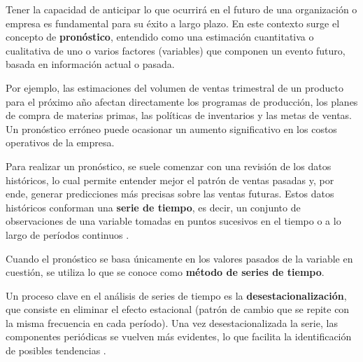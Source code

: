 Tener la capacidad de anticipar lo que ocurrirá en el futuro de una organización
o empresa es fundamental para su éxito a largo plazo.
En este contexto surge el concepto de \textbf{pronóstico}, entendido como una
estimación cuantitativa o cualitativa de uno o varios factores (variables) que
componen un evento futuro, basada en información actual o pasada.

Por ejemplo, las estimaciones del volumen de ventas trimestral de un producto
para el próximo año afectan directamente los programas de producción, los planes
de compra de materias primas, las políticas de inventarios y las metas de
ventas.
Un pronóstico erróneo puede ocasionar un aumento significativo en los costos
operativos de la empresa.

Para realizar un pronóstico, se suele comenzar con una revisión de los datos
históricos, lo cual permite entender mejor el patrón de ventas pasadas y, por
ende, generar predicciones más precisas sobre las ventas futuras.
Estos datos históricos conforman una \textbf{serie de tiempo}, es decir, un
conjunto de observaciones de una variable tomadas en puntos sucesivos en el
tiempo o a lo largo de períodos continuos \cite{Enders2015}.

Cuando el pronóstico se basa únicamente en los valores pasados de la variable en
cuestión, se utiliza lo que se conoce como \textbf{método de series de tiempo}.

Un proceso clave en el análisis de series de tiempo es la
\textbf{desestacionalización}, que consiste en eliminar el efecto estacional
(patrón de cambio que se repite con la misma frecuencia en cada período).
Una vez desestacionalizada la serie, las componentes periódicas se vuelven más
evidentes, lo que facilita la identificación de posibles tendencias \cite{Anderson}.
